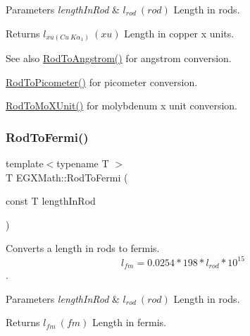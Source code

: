 \begin{DoxyParams}{Parameters}
{\em length\+In\+Rod} & $ l_{rod}\ (rod)$ Length in rods. \\
\hline
\end{DoxyParams}
\begin{DoxyReturn}{Returns}
$ l_{xu(Cu\ K\alpha_1)}\ (xu)$ Length in copper x units. 
\end{DoxyReturn}
\begin{DoxySeeAlso}{See also}
\mbox{\hyperlink{group___e_g_x_math-_conversions-_length_conversions-_imperial-_rod-_non-_s_i_ga079b9122c8747685d7057ec05fefdb7f}{Rod\+To\+Angstrom()}} for angstrom conversion. 

\mbox{\hyperlink{group___e_g_x_math-_conversions-_length_conversions-_imperial-_rod-_s_i_ga212e66c6922a0df85714ec8559af8790}{Rod\+To\+Picometer()}} for picometer conversion. 

\mbox{\hyperlink{group___e_g_x_math-_conversions-_length_conversions-_imperial-_rod-_non-_s_i_gac5c3c27eea891ef32353d16c6b8c57ab}{Rod\+To\+Mo\+X\+Unit()}} for molybdenum x unit conversion. 
\end{DoxySeeAlso}
\mbox{\label{group___e_g_x_math-_conversions-_length_conversions-_imperial-_rod-_non-_s_i_ga8397c0761e32cb6cfa632854d26023a5}} 
\subsubsection{\texorpdfstring{Rod\+To\+Fermi()}{RodToFermi()}}
{\footnotesize\ttfamily template$<$typename T $>$ \\
T E\+G\+X\+Math\+::\+Rod\+To\+Fermi (\begin{DoxyParamCaption}\item[{const T}]{length\+In\+Rod }\end{DoxyParamCaption})}



Converts a length in rods to fermis. \[ l_{fm}=0.0254 * 198 * l_{rod} * 10^{15} \]. 


\begin{DoxyParams}{Parameters}
{\em length\+In\+Rod} & $ l_{rod}\ (rod)$ Length in rods. \\
\hline
\end{DoxyParams}
\begin{DoxyReturn}{Returns}
$ l_{fm}\ (fm)$ Length in fermis. 
\end{DoxyReturn}
\mbox{\label{group___e_g_x_math-_conversions-_length_conversions-_imperial-_rod-_non-_s_i_ga91daf7bb89d486f6c8523a5436e5599d}} 
